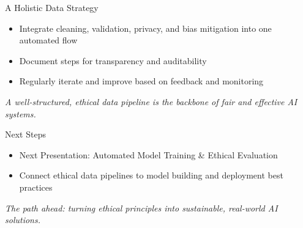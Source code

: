 \documentclass[aspectratio=169]{beamer}
\begin{document}
%
\begin{frame}{A Holistic Data Strategy}
\begin{itemize}
\item Integrate cleaning, validation, privacy, and bias mitigation into one automated flow
\item Document steps for transparency and auditability
\item Regularly iterate and improve based on feedback and monitoring
\end{itemize}

\emph{A well-structured, ethical data pipeline is the backbone of fair and effective AI systems.}
\end{frame}

%
%
\begin{frame}{Next Steps}
\begin{itemize}
\item Next Presentation: Automated Model Training \& Ethical Evaluation
\item Connect ethical data pipelines to model building and deployment best practices
\end{itemize}

\emph{The path ahead: turning ethical principles into sustainable, real-world AI solutions.}
\end{frame}
\end{document}
